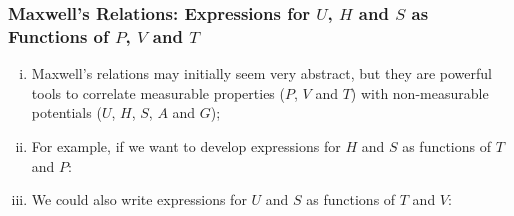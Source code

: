 \documentclass[10pt,compress,handout,unknownkeysallowed]{beamer}
\begin{document}
\begin{frame}
  \frametitle{Maxwell's Relations: Expressions for $U$, $H$ and $S$ as Functions of $P$, $V$ and $T$}
      \begin{enumerate}[i)]
           \item<1-> Maxwell's relations may initially seem very abstract, but they are powerful tools to correlate measurable properties ($P$, $V$ and $T$) with non-measurable potentials ($U$, $H$, $S$, $A$ and $G$);
           \item<2-> For example, if we want to develop expressions for $H$ and $S$ as functions of $T$ and $P$:
           \item<3-> We could also write expressions for $U$ and $S$ as functions of $T$ and $V$:
      \end{enumerate}
\end{frame}
\normalsize
\end{document}

